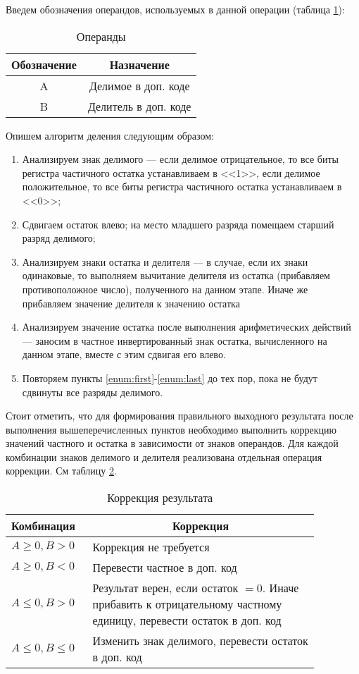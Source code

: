 \documentclass[a4paper,14pt]{extarticle}
\begin{document}
Введем обозначения операндов, используемых в данной операции (таблица \ref{tab:vars}):
\begin{table}[h!]
	\centering
	\begin{tabular}{|c|c|}
		\hline
		\multicolumn{1}{|c|}{\textbf{Обозначение}} & \multicolumn{1}{c|}{\textbf{Назначение}} \\ \hline
		A & Делимое в доп. коде \\ \hline
		B & Делитель в доп. коде \\ \hline
	\end{tabular}
	\label{tab:vars}
	\caption{Операнды}
\end{table} 
\newpage
Опишем алгоритм деления следующим образом:
\begin{enumerate}
	\item \label{enum:first} Анализируем знак делимого --- если делимое отрицательное, то все биты регистра частичного остатка устанавливаем в <<1>>, если делимое положительное, то все биты регистра частичного остатка устанавливаем в <<0>>;
	\item Сдвигаем остаток влево; на место младшего разряда помещаем старший разряд делимого;
	\item Анализируем знаки остатка и делителя --- в случае, если их знаки одинаковые, то выполняем вычитание делителя из остатка (прибавляем противоположное число), полученного на данном этапе. Иначе же прибавляем значение делителя к значению остатка%
	\item \label{enum:last} Анализируем значение остатка после выполнения арифметических действий --- заносим в частное инвертированный знак остатка, вычисленного на данном этапе, вместе с этим сдвигая его влево. 
	\item Повторяем пункты \ref{enum:first}-\ref{enum:last} до тех пор, пока не будут сдвинуты все разряды делимого. 
\end{enumerate}

Стоит отметить, что для формирования правильного выходного результата после выполнения вышеперечисленных пунктов необходимо выполнить коррекцию значений частного и остатка в зависимости от знаков операндов. Для каждой комбинации знаков делимого и делителя реализована отдельная операция коррекции. См таблицу \ref{tab:correction4}.

\begin{table}[h!]
	\centering
	\begin{tabular}{|m{0.2\linewidth}|m{0.67\linewidth}|}
		\hline
		\textbf{Комбинация} &\multicolumn{1}{c|}{\textbf{Коррекция}}\\
		\hline
		$A\ge0, B>0 $ & Коррекция не требуется \\ 
		\hline
		$A\ge0, B<0$ & Перевести частное в доп. код\\
		\hline
		$A\le0, B>0$ & Результат верен, если остаток $=0$. Иначе прибавить к отрицательному частному единицу, перевести остаток в доп. код\\
		\hline
		$A\le 0, B\le 0$ & Изменить знак делимого, перевести остаток в доп. код\\
		\hline
	\end{tabular}
	\caption{Коррекция результата}
	\label{tab:correction4}
\end{table}
\newpage
\end{document}
